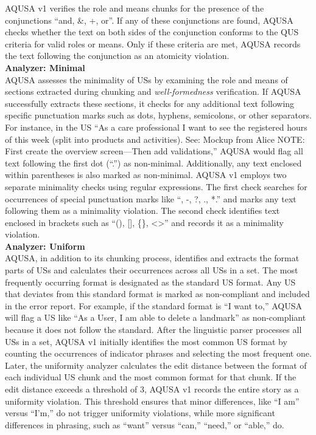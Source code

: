 AQUSA v1 verifies the role and means chunks for the presence of the conjunctions \enquote{and, \&, +, or}. If any of these conjunctions are found, AQUSA checks whether the text on both sides of the conjunction conforms to the QUS criteria for valid roles or means. Only if these criteria are met, AQUSA records the text following the conjunction as an atomicity violation. \\ 
\textbf{Analyzer: Minimal}\\ 
AQUSA assesses the minimality of USs by examining the role and means of sections extracted during chunking and \emph{well-formedness} verification. If AQUSA successfully extracts these sections, it checks for any additional text following specific punctuation marks such as dots, hyphens, semicolons, or other separators. For instance, in the US \enquote{As a care professional I want to see the registered hours of this week (split into products and activities). See: Mockup from Alice NOTE: First create the overview screen—Then add validations,} AQUSA would flag all text following the first dot (\enquote{.}) as non-minimal. Additionally, any text enclosed within parentheses is also marked as non-minimal.
AQUSA v1 employs two separate minimality checks using regular expressions. The first check searches for occurrences of special punctuation marks like \enquote{, -, ?, ., *.} and marks any text following them as a minimality violation. The second check identifies text enclosed in brackets such as \enquote{(), [], \{\}, \textless\textgreater} and records it as a minimality violation. \\ 
\textbf{Analyzer: Uniform}\\ 
AQUSA, in addition to its chunking process, identifies and extracts the format parts of USs and calculates their occurrences across all USs in a set. The most frequently occurring format is designated as the standard US format. Any US that deviates from this standard format is marked as non-compliant and included in the error report. For example, if the standard format is \enquote{I want to,} AQUSA will flag a US like \enquote{As a User, I am able to delete a landmark} as non-compliant because it does not follow the standard.
After the linguistic parser processes all USs in a set, AQUSA v1 initially identifies the most common US format by counting the occurrences of indicator phrases and selecting the most frequent one. Later, the uniformity analyzer calculates the edit distance between the format of each individual US chunk and the most common format for that chunk. If the edit distance exceeds a threshold of 3, AQUSA v1 records the entire story as a uniformity violation. This threshold ensures that minor differences, like \enquote{I am} versus \enquote{I'm,} do not trigger uniformity violations, while more significant differences in phrasing, such as \enquote{want} versus \enquote{can,} \enquote{need,} or \enquote{able,} do. \\ 
